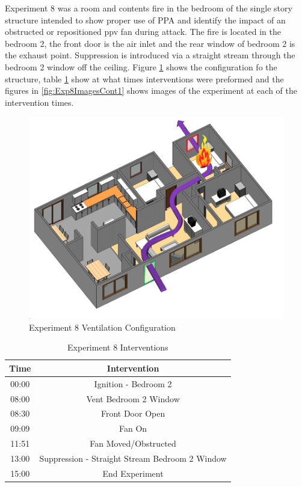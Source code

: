 \documentclass{article}
\begin{document}
Experiment 8 was a room and contents fire in the bedroom of the single story structure intended to show proper use of PPA and identify the impact of an obstructed or repositioned ppv fan during attack. The fire is located in the bedroom 2, the front door is the air inlet and the rear window of bedroom 2 is the exhaust point. Suppression is introduced via a straight stream through the bedroom 2 window off the ceiling. Figure \ref{fig:Exp8VentConfig} shows the configuration fo the structure, table \ref{Table:Exp8Interventions} show at what times interventions were preformed and the figures in \ref{fig:Exp8ImagesCont1} shows images of the experiment at each of the intervention times.

\begin{figure}[h!]
	\centering
	\includegraphics[width=5in]{0_Images/FireExperiments/Single_Story/Experiment_8.jpg}
	\caption{Experiment 8 Ventilation Configuration}
	\label{fig:Exp8VentConfig}
\end{figure}

\begin{table}[H]
	\centering
	\caption{Experiment 8 Interventions}
	\begin{tabular}{|c|c|} 
		\hline
		Time & Intervention \\ \hline \hline
		00:00 & Ignition - Bedroom 2\\ \hline
		08:00 & Vent Bedroom 2 Window\\ \hline
		08:30 & Front Door Open \\ \hline
		09:09 & Fan On \\ \hline
		11:51 & Fan Moved/Obstructed \\ \hline
		13:00 & Suppression - Straight Stream Bedroom 2 Window \\ \hline
		15:00 & End Experiment \\ \hline
	\end{tabular}
	\label{Table:Exp8Interventions}
\end{table}
\end{document}
